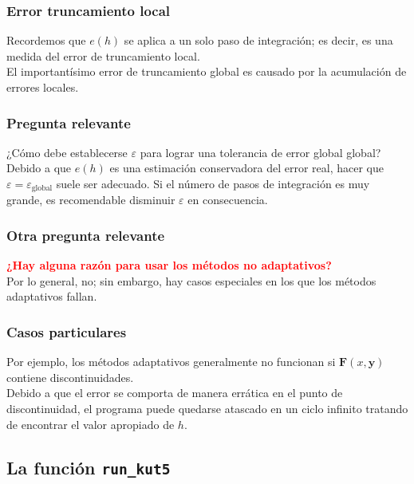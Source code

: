 \documentclass[12pt]{beamer}
\begin{document}
\begin{frame}
\frametitle{Error truncamiento local}
Recordemos que $e (h)$ se aplica a un solo paso de integración; es decir, es una medida del error de truncamiento local.
\\
\bigskip
\pause
El importantísimo error de truncamiento global es causado por la acumulación de errores locales.
\end{frame}
\begin{frame}
\frametitle{Pregunta relevante}
¿Cómo debe establecerse $\varepsilon$ para lograr una tolerancia de error global global?
\\
\bigskip
\pause
Debido a que $e (h)$ es una estimación conservadora del error real, \pause hacer que $\varepsilon = \varepsilon_{\text{global}}$ suele ser adecuado. \pause Si el número de pasos de integración es muy grande, es recomendable disminuir $\varepsilon$ en consecuencia.
\end{frame}
\begin{frame}
\frametitle{Otra pregunta relevante}
\textbf{\textcolor{red}{¿Hay alguna razón para usar los métodos no adaptativos?}}
\\
\bigskip
\pause
Por lo general, no; \pause sin embargo, hay casos especiales en los que los métodos adaptativos fallan.
\end{frame}
\begin{frame}
\frametitle{Casos particulares}
Por ejemplo, los métodos adaptativos generalmente no funcionan si $\mathbf{F} (x, \mathbf{y})$ contiene discontinuidades.
\\
\bigskip
\pause
Debido a que el error se comporta de manera errática en el punto de discontinuidad, el programa puede quedarse atascado en un ciclo infinito tratando de encontrar el valor apropiado de $h$. %
\end{frame}

\subsection{La función \texttt{run\_kut5}}
\end{document}
